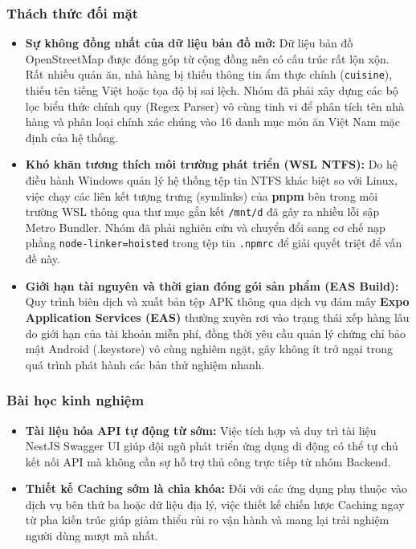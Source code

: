 \subsubsection{Thách thức đối mặt}
\begin{itemize}
    \item \textbf{Sự không đồng nhất của dữ liệu bản đồ mở:} Dữ liệu bản đồ OpenStreetMap được đóng góp từ cộng đồng nên có cấu trúc rất lộn xộn. Rất nhiều quán ăn, nhà hàng bị thiếu thông tin ẩm thực chính (\texttt{cuisine}), thiếu tên tiếng Việt hoặc tọa độ bị sai lệch. Nhóm đã phải xây dựng các bộ lọc biểu thức chính quy (Regex Parser) vô cùng tinh vi để phân tích tên nhà hàng và phân loại chính xác chúng vào 16 danh mục món ăn Việt Nam mặc định của hệ thống.
    \item   \textbf{Khó khăn tương thích môi trường phát triển (WSL NTFS):} Do hệ điều hành Windows quản lý hệ thống tệp tin NTFS khác biệt so với Linux, việc chạy các liên kết tượng trưng (symlinks) của \textbf{pnpm} bên trong môi trường WSL thông qua thư mục gắn kết \texttt{/mnt/d} đã gây ra nhiều lỗi sập Metro Bundler. Nhóm đã phải nghiên cứu và chuyển đổi sang cơ chế nạp phẳng \texttt{node-linker=hoisted} trong tệp tin \texttt{.npmrc} để giải quyết triệt để vấn đề này.
    \item \textbf{Giới hạn tài nguyên và thời gian đóng gói sản phẩm (EAS Build):} Quy trình biên dịch và xuất bản tệp APK thông qua dịch vụ đám mây \textbf{Expo Application Services (EAS)} thường xuyên rơi vào trạng thái xếp hàng lâu do giới hạn của tài khoản miễn phí, đồng thời yêu cầu quản lý chứng chỉ bảo mật Android (.keystore) vô cùng nghiêm ngặt, gây không ít trở ngại trong quá trình phát hành các bản thử nghiệm nhanh.
\end{itemize}

\subsubsection{Bài học kinh nghiệm}
\begin{itemize}
    \item \textbf{Tài liệu hóa API tự động từ sớm:} Việc tích hợp và duy trì tài liệu NestJS Swagger UI giúp đội ngũ phát triển ứng dụng di động có thể tự chủ kết nối API mà không cần sự hỗ trợ thủ công trực tiếp từ nhóm Backend.
    \item \textbf{Thiết kế Caching sớm là chìa khóa:} Đối với các ứng dụng phụ thuộc vào dịch vụ bên thứ ba hoặc dữ liệu địa lý, việc thiết kế chiến lược Caching ngay từ pha kiến trúc giúp giảm thiểu rủi ro vận hành và mang lại trải nghiệm người dùng mượt mà nhất.
\end{itemize}


